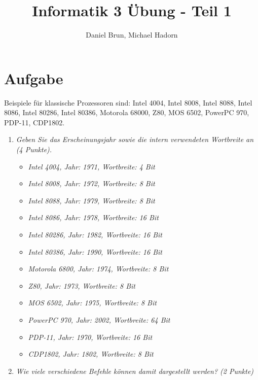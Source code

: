 \documentclass[10pt]{article}
\title{Informatik 3 Übung - Teil 1\vspace{-2ex}}
\author{Daniel Brun, Michael Hadorn\vspace{-2ex}}
\begin{document}
\maketitle

\section{Aufgabe}
Beispiele für klassische Prozessoren sind: Intel 4004, Intel 8008, Intel 8088, Intel 8086, Intel 80286, Intel 80386, Motorola 68000, Z80, MOS 6502, PowerPC 970, PDP-11, CDP1802.

\begin{enumerate}[label=\alph*)]
	\item 
	\textit{Geben Sie das Erscheinungsjahr sowie die intern verwendeten Wortbreite an (4 Punkte).}
	\begin{itemize}
		\item
		\textit{Intel 4004, Jahr: 1971, Wortbreite: 4 Bit}
		\item
		\textit{Intel 8008, Jahr: 1972, Wortbreite: 8 Bit}
		\item
		\textit{Intel 8088, Jahr: 1979, Wortbreite: 8 Bit}
		\item
		\textit{Intel 8086, Jahr: 1978, Wortbreite: 16 Bit}
		\item
		\textit{Intel 80286, Jahr: 1982, Wortbreite: 16 Bit}
		\item
		\textit{Intel 80386, Jahr: 1990, Wortbreite: 16 Bit}
		\item
		\textit{Motorola 6800, Jahr: 1974, Wortbreite: 8 Bit}
		\item
		\textit{Z80, Jahr: 1973, Wortbreite: 8 Bit}
		\item
		\textit{MOS 6502, Jahr: 1975, Wortbreite: 8 Bit}
		\item
		\textit{PowerPC 970, Jahr: 2002, Wortbreite: 64 Bit}
		\item
		\textit{PDP-11, Jahr: 1970, Wortbreite: 16 Bit}
		\item
		\textit{CDP1802, Jahr: 1802, Wortbreite: 8 Bit}
	\end{itemize}
	\item
	\textit{Wie viele verschiedene Befehle können damit dargestellt werden? (2 Punkte)}\\
	
\end{enumerate}


\end{document}
